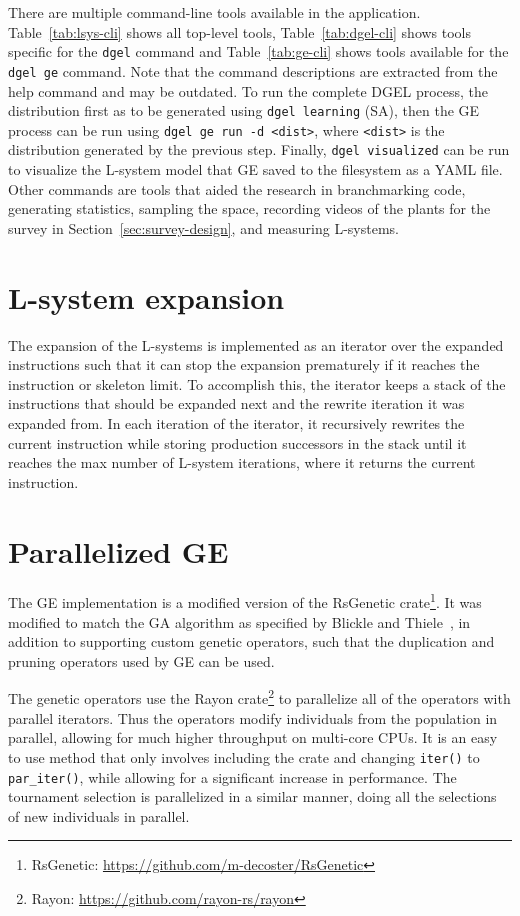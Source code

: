 There are multiple command-line tools available in the application.
Table~\ref{tab:lsys-cli} shows all top-level tools, Table~\ref{tab:dgel-cli} shows tools specific for the \texttt{dgel} command and Table~\ref{tab:ge-cli} shows tools available for the \texttt{dgel ge} command.
Note that the command descriptions are extracted from the help command and may be outdated.
To run the complete DGEL process, the distribution first as to be generated using \texttt{dgel learning} (\gls{SA}), then the \gls{GE} process can be run using \texttt{dgel ge run -d <dist>}, where \texttt{<dist>} is the distribution generated by the previous step.
Finally, \texttt{dgel visualized} can be run to visualize the L-system model that \gls{GE} saved to the filesystem as a YAML file.
Other commands are tools that aided the research in branchmarking code, generating statistics, sampling the space, recording videos of the plants for the survey in Section~\ref{sec:survey-design}, and measuring L-systems.

\section{L-system expansion}
The expansion of the \glspl{L-system} is implemented as an iterator over the expanded instructions such that it can stop the expansion prematurely if it reaches the instruction or skeleton limit.
To accomplish this, the iterator keeps a stack of the instructions that should be expanded next and the rewrite iteration it was expanded from.
In each iteration of the iterator, it recursively rewrites the current instruction while storing production successors in the stack until it reaches the max number of \gls{L-system} iterations, where it returns the current instruction.

\section[Parallelized GE]{Parallelized \gls{GE}}
The \gls{GE} implementation is a modified version of the RsGenetic crate\footnote{RsGenetic: \url{https://github.com/m-decoster/RsGenetic}}.
It was modified to match the \gls{GA} algorithm as specified by Blickle and Thiele~\cite{1995Blickle}, in addition to supporting custom genetic operators, such that the duplication and pruning operators used by \gls{GE} can be used.

The genetic operators use the Rayon crate\footnote{Rayon: \url{https://github.com/rayon-rs/rayon}} to parallelize all of the operators with parallel iterators.
Thus the operators modify individuals from the population in parallel, allowing for much higher throughput on multi-core CPUs.
It is an easy to use method that only involves including the crate and changing \texttt{iter()} to \texttt{par\_iter()}, while allowing for a significant increase in performance.
The tournament selection is parallelized in a similar manner, doing all the selections of new individuals in parallel.

